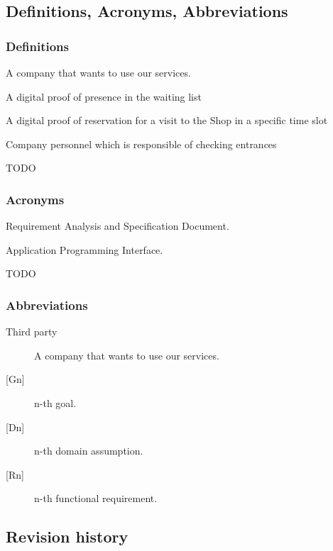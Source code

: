 \subsection{Definitions, Acronyms, Abbreviations}
\subsubsection{Definitions}
\begin{description}
    \item [Third party company] A company that wants to use our services.
    \item [Ticket] A digital proof of presence in the waiting list
    \item [Booking] A digital proof of reservation for a visit to the Shop in a specific time slot
    \item [Token] 
    \item [Staff] Company personnel which is responsible of checking entrances
    {\todo
        \item \huge TODO
    }
\end{description}
\subsubsection{Acronyms}
\begin{description}
    \item [RASD] Requirement Analysis and Specification Document. 
    \item [API] Application Programming Interface.
    {\todo
        \item \huge TODO
    }
\end{description}
\subsubsection{Abbreviations}
\begin{description}
    \item [Third party] A company that wants to use our services.
    \item [{[Gn]}] n-th goal. 
    \item [{[Dn]}] n-th domain assumption. 
    \item [{[Rn]}] n-th functional requirement. 
\end{description}

\subsection{Revision history}

